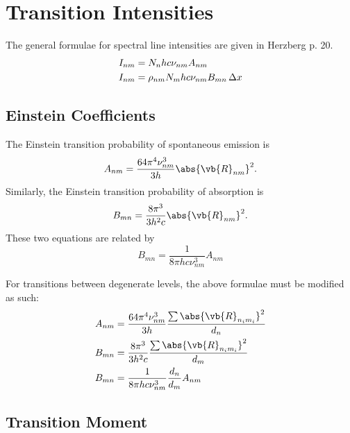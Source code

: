\documentclass[11pt, twoside, fleqn]{report}
\begin{document}
\section{Transition Intensities}

The general formulae for spectral line intensities are given in Herzberg p. 20.
\begin{align*}
    I_{nm} & = N_{n}hc\nu_{nm}A_{nm}                  \\
    I_{nm} & = \rho_{nm}N_{m}hc\nu_{nm}B_{mn}\adif{x}
\end{align*}

\subsection{Einstein Coefficients}

The Einstein transition probability of spontaneous emission is
\begin{equation*}
    A_{nm} = \frac{64\pi^{4}\nu_{nm}^{3}}{3h}\abs{\vb{R}_{nm}}^{2}.
\end{equation*}
Similarly, the Einstein transition probability of absorption is
\begin{equation*}
    B_{mn} = \frac{8\pi^{3}}{3h^{2}c}\abs{\vb{R}_{nm}}^{2}.
\end{equation*}
These two equations are related by
\begin{equation*}
    B_{mn} = \frac{1}{8\pi hc\nu_{nm}^{3}}A_{nm}
\end{equation*}

For transitions between degenerate levels, the above formulae must be modified as such:
\begin{align*}
    A_{nm} & = \frac{64\pi^{4}\nu_{nm}^{3}}{3h}\frac{\sum\abs{\vb{R}_{n_{i}m_{i}}}^{2}}{d_{n}} \\
    B_{mn} & = \frac{8\pi^{3}}{3h^{2}c}\frac{\sum\abs{\vb{R}_{n_{i}m_{i}}}^{2}}{d_{m}}         \\
    B_{mn} & = \frac{1}{8\pi hc\nu_{nm}^{3}}\frac{d_{n}}{d_{m}}A_{nm}
\end{align*}

\subsection{Transition Moment}
\end{document}

